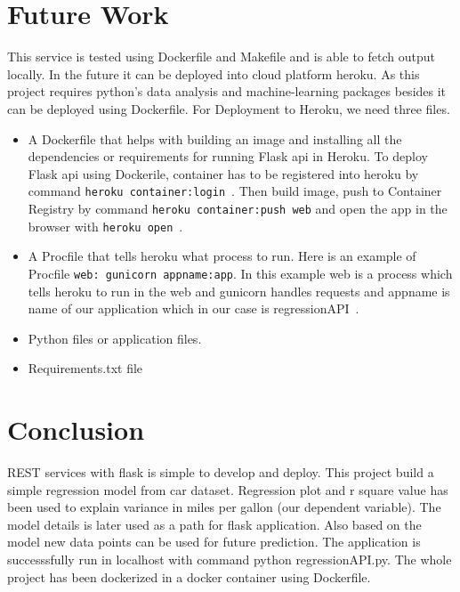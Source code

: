 \section{Future Work} 

This service is tested using Dockerfile and Makefile and is able to fetch
output locally. In the future it can be deployed into cloud platform heroku.
As this project requires python's data analysis and machine-learning packages 
besides it can be deployed using Dockerfile. For Deployment to Heroku, we need 
three files.
\begin{itemize}
 \item A Dockerfile that helps with building an image and installing all the 
 dependencies or requirements for running Flask api in Heroku. To deploy Flask 
 api using Dockerile, container has to be registered into heroku by command
 \verb|heroku container:login|~\cite{hid-sp18-415-heroku-com}. Then build image,
 push to Container Registry by command 
 \verb|heroku container:push web| and open the app in the browser with
 \verb|heroku open|~\cite{hid-sp18-415-heroku-com}.
 
 \item A Procfile that tells heroku what process to run. Here is an example of 
 Procfile \verb|web: gunicorn appname:app|. In this example web is a process
 which tells heroku to run in the web and gunicorn handles requests and appname 
 is name of our application which in our case is 
 regressionAPI~\cite{hid-sp18-415-regressionapi}.
 \item Python files or application files.
 \item Requirements.txt file
 
 \end{itemize}

\section{Conclusion}

REST services with flask is simple to develop and deploy. 
This project build a
simple regression model from car dataset. Regression plot and r square
value has been used to explain variance in miles per gallon (our dependent
variable). The model details is later used as 
a path for flask application. Also based on the model new data points can be 
used for future prediction. The application is successsfully run in localhost
with command python regressionAPI.py. The whole project has been dockerized in
a docker container using Dockerfile. 




